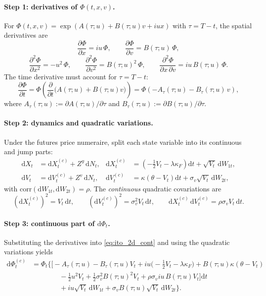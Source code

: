 \documentclass[a4paper,titlepage,12pt]{report}
\theoremstyle{plain}
\begin{document}
\paragraph{Step 1: derivatives of $\Phi(t,x,v)$.}
For $\Phi(t,x,v)=\exp(A(\tau;u)+B(\tau;u)v+iux)$ with $\tau=T-t$, the spatial derivatives are
\[
\frac{\partial \Phi}{\partial x}=iu\,\Phi,
\qquad
\frac{\partial \Phi}{\partial v}=B(\tau;u)\,\Phi,
\]
\[
\frac{\partial^2 \Phi}{\partial x^2}=-u^2\,\Phi,
\qquad
\frac{\partial^2 \Phi}{\partial v^2}=B(\tau;u)^2\,\Phi,
\qquad
\frac{\partial^2 \Phi}{\partial x\,\partial v}=iu\,B(\tau;u)\,\Phi.
\]
The time derivative must account for $\tau=T-t$:
\[
\frac{\partial \Phi}{\partial t}
=
\Phi\left(
\frac{\partial}{\partial t}\big(A(\tau;u)+B(\tau;u)v\big)
\right)
=
\Phi\left(
-A_\tau(\tau;u)-B_\tau(\tau;u)\,v
\right),
\]
where $A_\tau(\tau;u):=\partial A(\tau;u)/\partial \tau$ and $B_\tau(\tau;u):=\partial B(\tau;u)/\partial \tau$.

\paragraph{Step 2: dynamics and quadratic variations.}
Under the futures price numeraire, split each state variable into its continuous and jump parts:
\begin{align}
\mathrm{d}X_t &= \mathrm{d}X_t^{(c)} + Z^y\,\mathrm{d}N_t,
&
\mathrm{d}X_t^{(c)}
&=
\left(-\frac12 V_t-\lambda\kappa_F\right)\mathrm{d}t
+
\sqrt{V_t}\,\mathrm{d}W_{1t},
\\
\mathrm{d}V_t &= \mathrm{d}V_t^{(c)} + Z^v\,\mathrm{d}N_t,
&
\mathrm{d}V_t^{(c)}
&=
\kappa(\theta-V_t)\mathrm{d}t
+
\sigma_v\sqrt{V_t}\,\mathrm{d}W_{2t},
\end{align}
with $\mathrm{corr}(\mathrm{d}W_{1t},\mathrm{d}W_{2t})=\rho$.
The \emph{continuous} quadratic covariations are
\[
(\mathrm{d}X_t^{(c)})^2 = V_t\,\mathrm{d}t,
\qquad
(\mathrm{d}V_t^{(c)})^2 = \sigma_v^2 V_t\,\mathrm{d}t,
\qquad
\mathrm{d}X_t^{(c)}\,\mathrm{d}V_t^{(c)} = \rho\sigma_v V_t\,\mathrm{d}t.
\]

\paragraph{Step 3: continuous part of $\mathrm{d}\Phi_t$.}
Substituting the derivatives into \eqref{eq:ito_2d_cont} and using the quadratic variations yields
\begin{align}
\mathrm{d}\Phi_t^{(c)}
&=
\Phi_t\Bigg\{
\Big[
-A_\tau(\tau;u)-B_\tau(\tau;u)V_t
+iu\Big(-\tfrac12V_t-\lambda\kappa_F\Big)
+B(\tau;u)\kappa(\theta-V_t)
\nonumber\\
&\qquad\qquad
-\tfrac12u^2V_t
+\tfrac12\sigma_v^2 B(\tau;u)^2 V_t
+\rho\sigma_v iu\,B(\tau;u)V_t
\Big]\mathrm{d}t
\nonumber\\
&\qquad\qquad
+iu\sqrt{V_t}\,\mathrm{d}W_{1t}
+\sigma_v B(\tau;u)\sqrt{V_t}\,\mathrm{d}W_{2t}
\Bigg\}.
\label{eq:dPhi_cont_final}
\end{align}
\end{document}
